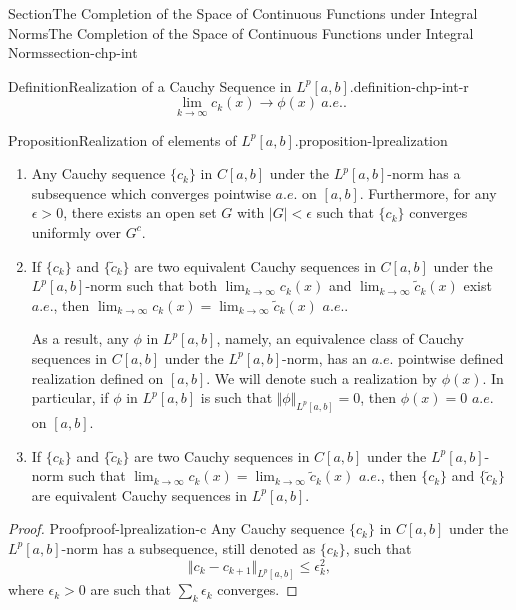 \documentclass[oneside,10pt,]{article}
\numberwithin{equation}{section}
\begin{document}
\begin{sectionptx}{Section}{The Completion of the Space of Continuous Functions under Integral Norms}{}{The Completion of the Space of Continuous Functions under Integral Norms}{}{}{section-chp-int}
\begin{definition}{Definition}{Realization of a Cauchy Sequence in \(L^{p}[a, b]\).}{definition-chp-int-r}
\begin{equation*}
\lim_{k\to \infty} c_{k}(x)\to \phi (x) \ a.e..
\end{equation*}
%
\end{definition}
\begin{proposition}{Proposition}{Realization of elements of \(L^{p}[a, b]\).}{}{proposition-lprealization}%
%
\begin{enumerate}[label=(\roman*)]
\item{}Any Cauchy sequence \(\{ c_{k}\}\) in \(C[a, b]\) under the \(L^{p}[a,  b]\)-norm has a subsequence which converges pointwise \(a.e.\) on \([a, b]\). Furthermore, for any \(\epsilon > 0\), there exists an open set \(G\) with \(|G| < \epsilon\) such that  \(\{ c_{k}\}\) converges uniformly over \(G^{c}\).%
\item{}If \(\{ c_{k}\}\) and \(\{ \tilde c_{k}\}\) are two equivalent Cauchy sequences  in \(C[a, b]\) under the \(L^{p}[a,  b]\)-norm such that both \(\lim_{k\to \infty} c_{k}(x)\) and \(\lim_{k\to \infty} \tilde c_{k}(x)\) exist \(a.e.\), then \(\lim_{k\to \infty} c_{k}(x)=\lim_{k\to \infty} \tilde c_{k}(x)\) \(a.e. \).%
\par
As a result, any \(\phi\) in \(L^{p}[a, b]\), namely, an equivalence class of Cauchy sequences in \(C[a, b]\) under the \(L^{p}[a,  b]\)-norm,  has an \(a.e.\)  pointwise defined realization defined on \([a, b]\). We will denote such a realization by \(\phi (x)\). In particular, if \(\phi\) in \(L^{p}[a, b]\) is such that \(\Vert \phi \Vert_{L^{p}[a, b]}=0\), then \(\phi(x)=0\) \(a.e.\) on \([a, b]\).%
\item{}If \(\{ c_{k}\}\) and \(\{ \tilde c_{k}\}\) are two Cauchy sequences  in \(C[a, b]\) under the \(L^{p}[a,  b]\)-norm such that \(\lim_{k\to \infty} c_{k}(x)=\lim_{k\to \infty} \tilde c_{k}(x)\) \(a.e.\), then \(\{ c_{k}\}\) and \(\{ \tilde c_{k}\}\) are equivalent Cauchy sequences in \(L^{p}[a,  b]\).%
\end{enumerate}
\end{proposition}
\begin{proof}{Proof}{}{proof-lprealization-c}
Any Cauchy sequence \(\{ c_{k}\}\) in \(C[a, b]\) under the \(L^{p}[a,  b]\)-norm has a subsequence, still denoted as \(\{ c_{k}\}\), such that%
\begin{equation*}
\Vert c_{k} -c_{k+1}\Vert_{L^{p}[a, b]}\le \epsilon_{k}^{2},
\end{equation*}
where \(\epsilon_{k} > 0\) are such that \(\sum_{k} \epsilon_{k}\) converges.%
\par

\end{proof}
\end{sectionptx}
\end{document}
